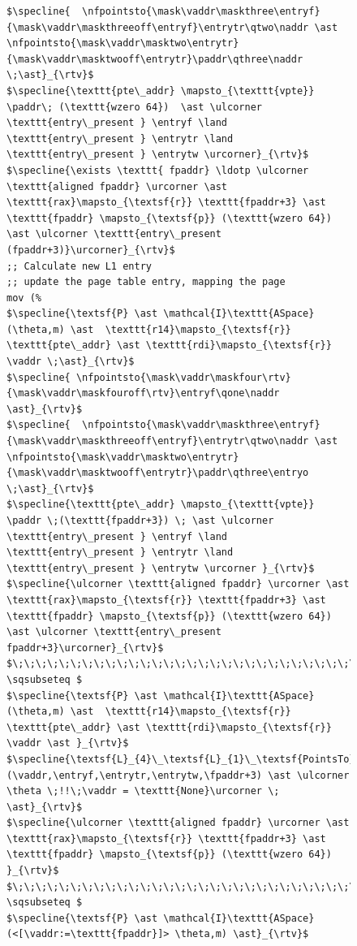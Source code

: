 \documentclass[acmsmall,screen,nonacm]{acmart}
\newcommand{\naddr}{\kw{a}}
\newcommand{\vaddr}{\kw{va}}
\newcommand{\nfpointsto}[5]{#1\sim#2 \mapsto_{#5}\{#4\}\;#3}
\newcommand{\maskfour}{\textsf{l4M52}}
\newcommand{\maskfouroff}{\textsf{l4off}}
\newcommand{\maskthree}{\textsf{l3M52}}
\newcommand{\maskthreeoff}{\textsf{l3off}}
\newcommand{\masktwo}{\textsf{l2M52}}
\newcommand{\masktwooff}{\textsf{l2off}}
\newcommand{\mask}[3]{(#2\; #1 \; #3)}
\newcommand{\entryf}{\textsf{l4e}}
\newcommand{\entrytr}{\textsf{l3e}}
\newcommand{\entrytw}{\textsf{l2e}}
\newcommand{\entryo}{\textsf{l1e}}
\newcommand{\paddr}{\textsf{pa}}
\newcommand{\kw}[1]{\mathsf{#1}}
\begin{document}
\begin{figure}
\begin{lstlisting}
$\specline{  \nfpointsto{\mask\vaddr\maskthree\entryf}{\mask\vaddr\maskthreeoff\entryf}\entrytr\qtwo\naddr \ast \nfpointsto{\mask\vaddr\masktwo\entrytr}{\mask\vaddr\masktwooff\entrytr}\paddr\qthree\naddr \;\ast}_{\rtv}$
$\specline{\texttt{pte\_addr} \mapsto_{\texttt{vpte}} \paddr\; (\texttt{wzero 64})  \ast \ulcorner \texttt{entry\_present } \entryf \land \texttt{entry\_present } \entrytr \land  \texttt{entry\_present } \entrytw \urcorner}_{\rtv}$
$\specline{\exists \texttt{ fpaddr} \ldotp \ulcorner \texttt{aligned fpaddr} \urcorner \ast \texttt{rax}\mapsto_{\textsf{r}} \texttt{fpaddr+3} \ast \texttt{fpaddr} \mapsto_{\textsf{p}} (\texttt{wzero 64}) \ast \ulcorner \texttt{entry\_present (fpaddr+3)}\urcorner}_{\rtv}$
;; Calculate new L1 entry
;; update the page table entry, mapping the page
mov (%
$\specline{\textsf{P} \ast \mathcal{I}\texttt{ASpace}(\theta,m) \ast  \texttt{r14}\mapsto_{\textsf{r}} \texttt{pte\_addr} \ast \texttt{rdi}\mapsto_{\textsf{r}} \vaddr \;\ast}_{\rtv}$
$\specline{ \nfpointsto{\mask\vaddr\maskfour\rtv}{\mask\vaddr\maskfouroff\rtv}\entryf\qone\naddr \ast}_{\rtv}$ 
$\specline{  \nfpointsto{\mask\vaddr\maskthree\entryf}{\mask\vaddr\maskthreeoff\entryf}\entrytr\qtwo\naddr \ast \nfpointsto{\mask\vaddr\masktwo\entrytr}{\mask\vaddr\masktwooff\entrytr}\paddr\qthree\entryo \;\ast}_{\rtv}$
$\specline{\texttt{pte\_addr} \mapsto_{\texttt{vpte}} \paddr \;(\texttt{fpaddr+3}) \; \ast \ulcorner \texttt{entry\_present } \entryf \land \texttt{entry\_present } \entrytr \land  \texttt{entry\_present } \entrytw \urcorner }_{\rtv}$
$\specline{\ulcorner \texttt{aligned fpaddr} \urcorner \ast \texttt{rax}\mapsto_{\textsf{r}} \texttt{fpaddr+3} \ast \texttt{fpaddr} \mapsto_{\textsf{p}} (\texttt{wzero 64}) \ast \ulcorner \texttt{entry\_present fpaddr+3}\urcorner}_{\rtv}$
$\;\;\;\;\;\;\;\;\;\;\;\;\;\;\;\;\;\;\;\;\;\;\;\;\;\;\;\;\;\;\;\;\;\;\;\;\;\;\;\;\;\;\;\; \sqsubseteq $
$\specline{\textsf{P} \ast \mathcal{I}\texttt{ASpace}(\theta,m) \ast  \texttt{r14}\mapsto_{\textsf{r}} \texttt{pte\_addr} \ast \texttt{rdi}\mapsto_{\textsf{r}} \vaddr \ast }_{\rtv}$
$\specline{\textsf{L}_{4}\_\textsf{L}_{1}\_\textsf{PointsTo}(\vaddr,\entryf,\entrytr,\entrytw,\fpaddr+3) \ast \ulcorner \theta \;!!\;\vaddr = \texttt{None}\urcorner \; \ast}_{\rtv}$
$\specline{\ulcorner \texttt{aligned fpaddr} \urcorner \ast \texttt{rax}\mapsto_{\textsf{r}} \texttt{fpaddr+3} \ast \texttt{fpaddr} \mapsto_{\textsf{p}} (\texttt{wzero 64}) }_{\rtv}$
$\;\;\;\;\;\;\;\;\;\;\;\;\;\;\;\;\;\;\;\;\;\;\;\;\;\;\;\;\;\;\;\;\;\;\;\;\;\;\;\;\;\;\;\; \sqsubseteq $
$\specline{\textsf{P} \ast \mathcal{I}\texttt{ASpace} (<[\vaddr:=\texttt{fpaddr}]> \theta,m) \ast}_{\rtv}$

\end{lstlisting}
\end{figure}
\end{document}
